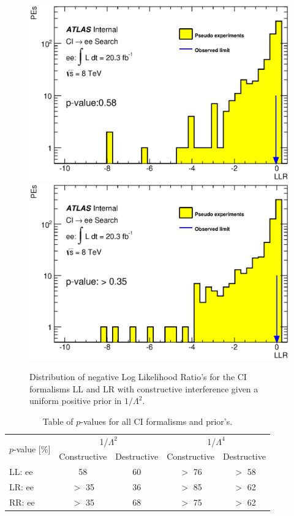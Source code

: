 
    \begin{figure}[h]
        \begin{center}
            \includegraphics[width=0.49\linewidth]{images/ee__LL_minus_L2/LLR.eps}
            \includegraphics[width=0.49\linewidth]{images/ee__LR_minus_L2/LLR.eps}
        \end{center}
       \caption{Distribution of negative Log Likelihood Ratio's for the CI formalisms LL and LR with constructive interference given a uniform positive prior in $1/\Lambda^{2}$.}
       \label{fig:LLR_CI_main}
    \end{figure}



    \begin {table}[h]
        \begin{center}
        \begin{tabular}{ | l | c | c | c | c | } 
            \hline
            \multirow{2}{*}{$p$-value [\%]} & \multicolumn{2}{c|}{1/$\Lambda^2$} & \multicolumn{2}{c|}{1/$\Lambda^4$} \\
            \cline{2-5}
            & Constructive & Destructive & Constructive & Destructive \\
            \hline
            LL: ee & 58 & 60 & $>$ 76 & $>$ 58 \\
            LR: ee & $>$ 35 & 36 & $>$ 85 & $>$ 62 \\
            RR: ee & $>$ 35 & 68 & $>$ 75 & $>$ 62 \\
            \hline
        \end{tabular}
        \caption{Table of $p$-values for all CI formalisms and prior's.}
        \label{tab:pvalue_CI}
        \end{center}
    \end {table}



